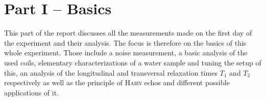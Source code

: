 \section{Part I -- Basics}
\label{sec:PartI}
This part of the report discusses all the measurements made on the first day of the experiment and their analysis.
The focus is therefore on the basics of this whole experiment. Those include a noise measurement, a basic analysis of the used coils, elementary characterizations of a water sample and tuning the setup of this, an analysis of the  longitudinal and transversal relaxation times $T_1$ and $T_2$ respectively as well as the principle of \textsc{Hahn} echos and different possible applications of it.
